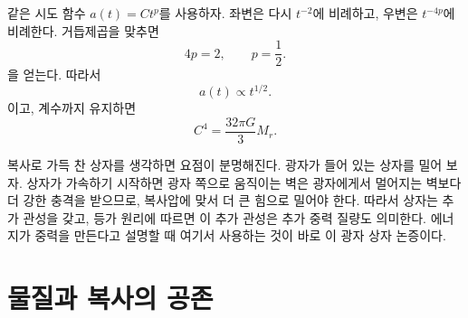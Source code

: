 같은 시도 함수 \(a(t)=Ct^p\)를 사용하자. 좌변은 다시 \(t^{-2}\)에 비례하고, 우변은 \(t^{-4p}\)에 비례한다. 거듭제곱을 맞추면
\begin{equation}
4p=2,
\qquad
p=\frac{1}{2}.
\end{equation}
을 얻는다. 따라서
\begin{equation}
a(t)\propto t^{1/2}.
\end{equation}
이고, 계수까지 유지하면
\begin{equation}
C^4=\frac{32\pi G}{3}M_r.
\end{equation}

\begin{classroomqa}
\end{classroomqa}

복사로 가득 찬 상자를 생각하면 요점이 분명해진다. 광자가 들어 있는 상자를 밀어 보자. 상자가 가속하기 시작하면 광자 쪽으로 움직이는 벽은 광자에게서 멀어지는 벽보다 더 강한 충격을 받으므로, 복사압에 맞서 더 큰 힘으로 밀어야 한다. 따라서 상자는 추가 관성을 갖고, 등가 원리에 따르면 이 추가 관성은 추가 중력 질량도 의미한다. 에너지가 중력을 만든다고 설명할 때 여기서 사용하는 것이 바로 이 광자 상자 논증이다.

\begin{classroomqa}
\end{classroomqa}

\begin{classroomqa}
\end{classroomqa}

\section{물질과 복사의 공존}

